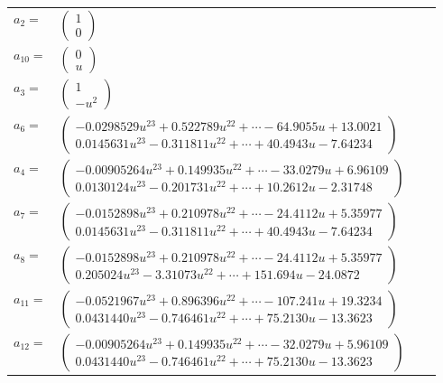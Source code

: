 \documentclass[1p]{elsarticle_modified}
\theoremstyle{definition}
\begin{document}
\begin{tabular}{m{7pt} m{180pt} m{7pt} m{180pt} }
\flushright $a_{2}=$&$\begin{pmatrix}1\\0\end{pmatrix}$ \\
\flushright $a_{10}=$&$\begin{pmatrix}0\\u\end{pmatrix}$ \\
\flushright $a_{3}=$&$\begin{pmatrix}1\\- u^2\end{pmatrix}$ \\
\flushright $a_{6}=$&$\begin{pmatrix}-0.0298529 u^{23}+0.522789 u^{22}+\cdots-64.9055 u+13.0021\\0.0145631 u^{23}-0.311811 u^{22}+\cdots+40.4943 u-7.64234\end{pmatrix}$ \\
\flushright $a_{4}=$&$\begin{pmatrix}-0.00905264 u^{23}+0.149935 u^{22}+\cdots-33.0279 u+6.96109\\0.0130124 u^{23}-0.201731 u^{22}+\cdots+10.2612 u-2.31748\end{pmatrix}$ \\
\flushright $a_{7}=$&$\begin{pmatrix}-0.0152898 u^{23}+0.210978 u^{22}+\cdots-24.4112 u+5.35977\\0.0145631 u^{23}-0.311811 u^{22}+\cdots+40.4943 u-7.64234\end{pmatrix}$ \\
\flushright $a_{8}=$&$\begin{pmatrix}-0.0152898 u^{23}+0.210978 u^{22}+\cdots-24.4112 u+5.35977\\0.205024 u^{23}-3.31073 u^{22}+\cdots+151.694 u-24.0872\end{pmatrix}$ \\
\flushright $a_{11}=$&$\begin{pmatrix}-0.0521967 u^{23}+0.896396 u^{22}+\cdots-107.241 u+19.3234\\0.0431440 u^{23}-0.746461 u^{22}+\cdots+75.2130 u-13.3623\end{pmatrix}$ \\
\flushright $a_{12}=$&$\begin{pmatrix}-0.00905264 u^{23}+0.149935 u^{22}+\cdots-32.0279 u+5.96109\\0.0431440 u^{23}-0.746461 u^{22}+\cdots+75.2130 u-13.3623\end{pmatrix}$ \\

\end{tabular}
\end{document}
